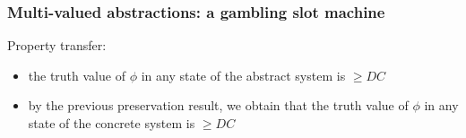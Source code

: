 \begin{frame}
\frametitle{Multi-valued abstractions: a gambling slot machine}

Property transfer:
\vspace{2mm}
\begin{itemize}
\setlength\itemsep{2ex}
\item the truth value of $\phi$ in any state of the abstract system 
is $\geq DC$
\item by the previous preservation result, we obtain
that \alert{the truth value of $\phi$ in any state of the concrete system 
is $\geq DC$}
\end{itemize}
\end{frame}